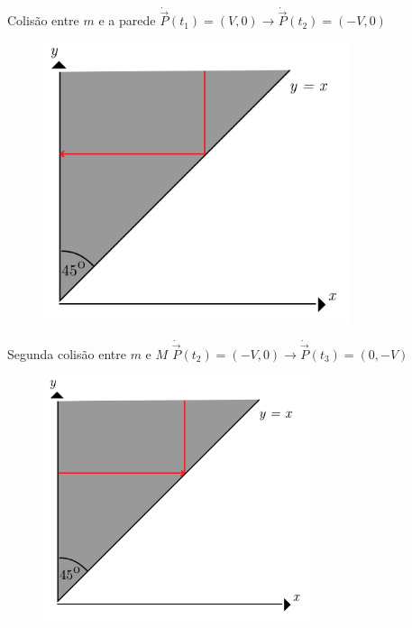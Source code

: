 \documentclass{beamer}
\begin{document}
\begin{frame}{Colisão entre $m$ e a parede}
  $\dot{\vec{P}}(t_1)=(V,0)\to\dot{\vec{P}}(t_2)=(-V,0)$
  \begin{figure}
    \centering
    \includegraphics[width=0.8\textwidth]{images/image1-3.png}
  \end{figure}
\end{frame}

\begin{frame}{Segunda colisão entre $m$ e $M$}
  $\dot{\vec{P}}(t_2)=(-V,0)\to\dot{\vec{P}}(t_3)=(0,-V)$
  \begin{figure}
    \centering
    \includegraphics[width=0.7\textwidth]{images/image1-4.png}
  \end{figure}
\end{frame}
\end{document}
